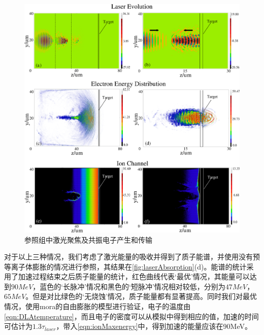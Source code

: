 \begin{figure}[!htbp]
  \centering
  \includegraphics[width=\MyFactor\textwidth]{Img/laserEvolution1.eps}
  \caption{参照组中激光聚焦及共振电子产生和传输}
  \label{fig:laserEvolution1}
\end{figure}


对于以上三种情况，我们考虑了激光能量的吸收并得到了质子能谱，并使用没有预等离子体膨胀的情况进行参照，其结果在\ref{fig:laserAbsorption}(d)。能谱的统计采用了加速过程结束之后质子能量的统计，红色曲线代表‘最优’情况，其能量可以达到$90MeV$，蓝色的‘长脉冲’情况和黑色的‘短脉冲’情况相对较低，分别为$47MeV$，$65MeV$。但是对比绿色的‘无烧蚀’情况，质子能量都有显著提高。同时我们对最优情况，使用mora的自由膨胀的模型进行验证，电子的温度由\ref{eqn:DLAtemperature}，而且电子的密度可以从模拟中得到相应的值，加速的时间可估计为$1.3 \tau_{laser}$\cite{fuchs2006laser}，带入\ref{eqn:ionMaxenergy}中，得到加速的能量应该在90MeV。


